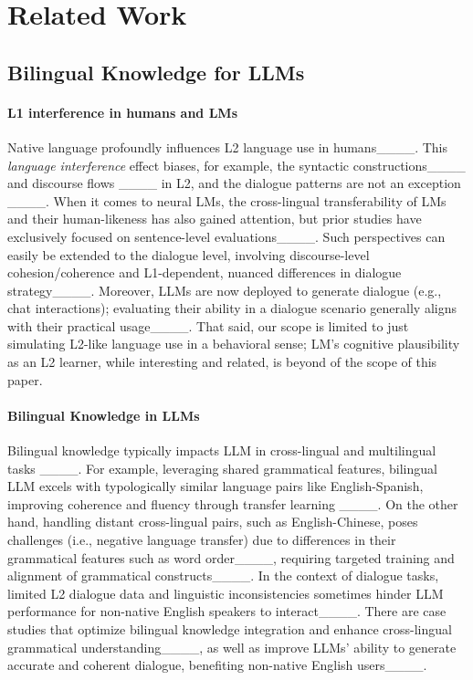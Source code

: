 \section{Related Work}
\label{sec:related-work}
\subsection{Bilingual Knowledge for LLMs}
\paragraph{L1 interference in humans and LMs} 
Native language profoundly influences L2 language use in humans____. This \textit{language interference} effect biases, for example, the syntactic constructions____ and discourse flows ____ in L2, and the dialogue patterns are not an exception ____.
When it comes to neural LMs, the cross-lingual transferability of LMs and their human-likeness has also gained attention, but prior studies have exclusively focused on sentence-level evaluations____. 
Such perspectives can easily be extended to the dialogue level, involving discourse-level cohesion/coherence and L1-dependent, nuanced differences in dialogue strategy____.
Moreover, LLMs are now deployed to generate dialogue (e.g., chat interactions); evaluating their ability in a dialogue scenario generally aligns with their practical usage____. That said, our scope is limited to just simulating L2-like language use in a behavioral sense; LM's cognitive plausibility as an L2 learner, while interesting and related, is beyond of the scope of this paper.

\paragraph{Bilingual Knowledge in LLMs}
Bilingual knowledge typically impacts LLM in cross-lingual and multilingual tasks ____. 
For example, leveraging shared grammatical features, bilingual LLM excels with typologically similar language pairs like English-Spanish, improving coherence and fluency through transfer learning ____. On the other hand, handling distant cross-lingual pairs, such as English-Chinese, poses challenges (i.e., negative language transfer) due to differences in their grammatical features such as word order____, requiring targeted training and alignment of grammatical constructs____. 
In the context of dialogue tasks, limited L2 dialogue data and linguistic inconsistencies sometimes hinder LLM performance for non-native English speakers to interact____. There are case studies that optimize bilingual knowledge integration and enhance cross-lingual grammatical understanding____, as well as improve LLMs' ability to generate accurate and coherent dialogue, benefiting non-native English users____.


